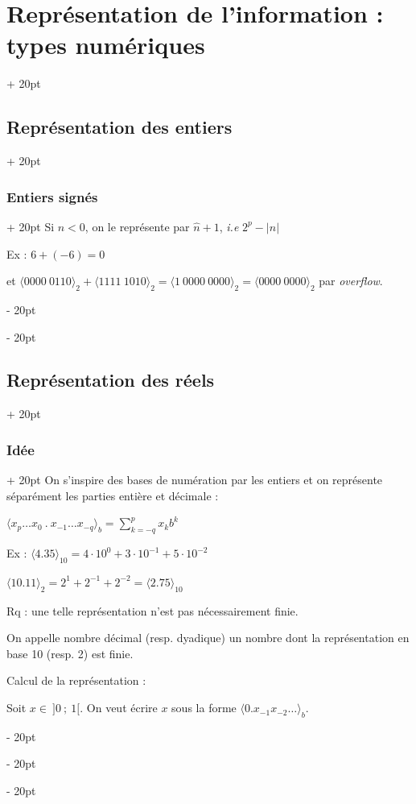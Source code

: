 \documentclass[a4paper, 12pt, twoside]{article}
\newcommand{\pt}[1]{\cdot 10^{#1}} %
\newcommand{\abs}[1]{\left\lvert #1 \right\rvert} %
\newcommand{\ind}[1][20pt]{\advance\leftskip + #1}
\newcommand{\deind}[1][20pt]{\advance\leftskip - #1}
\newenvironment{indentedenv}[1][20pt]{\par \ind[#1]}{\par \deind}
\newenvironment{indt}[2][20pt]{#2 \begin{indentedenv}[#1]}{\end{indentedenv}} %
\begin{document}
\begin{indt}{\section{Représentation de l'information : types numériques}}
\begin{indt}{\subsection{Représentation des entiers}}
\begin{indt}{\subsubsection{Entiers signés}}
                Si $n < 0$, on le représente par $\hat n + 1$, \textit{i.e} $2^p - \abs n$
                
                Ex :
                $6 + (-6) = 0$
                
                et $\langle 0000\ 0110 \rangle_2 + \langle 1111\ 1010 \rangle_2 = \langle 1\ 0000\ 0000 \rangle_2 = \langle 0000\ 0000 \rangle_2$ par \textit{overflow}.
            \end{indt}
        \end{indt}
            
        
        \begin{indt}{\subsection{Représentation des réels}}
            \begin{indt}{\subsubsection{Idée}}
                On s'inspire des bases de numération par les entiers et on représente séparément les parties entière et décimale :
                
                $\displaystyle \langle x_p \ldots x_0\ .\ x_{-1} \ldots x_{-q} \rangle_b = \sum_{k = -q}^p x_k b^k$
                
                Ex : $\langle 4.35 \rangle_{10} = 4 \pt{0} + 3 \pt{-1} + 5 \pt{-2}$
                
                $\langle {10}.11 \rangle_2 = 2^1 + 2^{-1} + 2^{-2} = \langle 2.75 \rangle_{10}$
                
                Rq : une telle représentation n'est pas nécessairement finie.
                
                \vspace{6pt}
                
                On appelle nombre décimal (resp. dyadique) un nombre dont la représentation en base 10 (resp. 2) est finie.
                
                \vspace{6pt}
                
                Calcul de la représentation :
                
                Soit $x \in\ ]0\ ;\ 1[$. On veut écrire $x$ sous la forme $\langle 0.x_{-1} x_{-2} \ldots \rangle_b$.
                

\end{indt}
\end{indt}
\end{indt}
\end{document}
